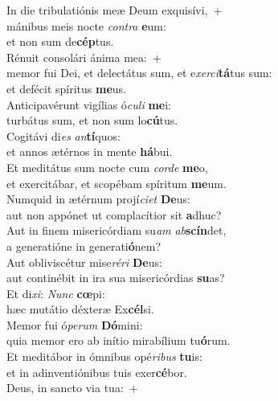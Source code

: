 \evenverse In die tribulatiónis meæ Deum exquisívi,~+\\\evenverse  mánibus meis nocte \textit{con}\textit{tra} \textbf{e}um:~\*\\
\evenverse et non sum de\textbf{cép}tus.\\
\oddverse Rénuit consolári ánima mea:~+\\
\oddverse  memor fui Dei, et delectátus sum, et e\textit{xer}\textit{ci}\textbf{tá}tus sum:~\*\\
\oddverse et defécit spíritus \textbf{me}us.\\
\evenverse Anticipavérunt vigílias ó\textit{cu}\textit{li} \textbf{me}i:~\*\\
\evenverse turbátus sum, et non sum lo\textbf{cú}tus.\\
\oddverse Cogitávi di\textit{es} \textit{an}\textbf{tí}quos:~\*\\
\oddverse et annos ætérnos in mente \textbf{há}bui.\\
\evenverse Et meditátus sum nocte cum \textit{cor}\textit{de} \textbf{me}o,~\*\\
\evenverse et exercitábar, et scopébam spíritum \textbf{me}um.\\
\oddverse Numquid in ætérnum projí\textit{ci}\textit{et} \textbf{De}us:~\*\\
\oddverse aut non appónet ut complacítior sit \textbf{a}dhuc?\\
\evenverse Aut in finem misericórdiam su\textit{am} \textit{ab}\textbf{scín}det,~\*\\
\evenverse a generatióne in generati\textbf{ó}nem?\\
\oddverse Aut obliviscétur mise\textit{ré}\textit{ri} \textbf{De}us:~\*\\
\oddverse aut continébit in ira sua misericórdias \textbf{su}as?\\
\evenverse Et di\textit{xi}: \textit{Nunc} \textbf{cœ}pi:~\*\\
\evenverse hæc mutátio déxteræ Ex\textbf{cél}si.\\
\oddverse Memor fui ó\textit{pe}\textit{rum} \textbf{Dó}mini:~\*\\
\oddverse quia memor ero ab inítio mirabílium tu\textbf{ó}rum.\\
\evenverse Et meditábor in ómnibus opé\textit{ri}\textit{bus} \textbf{tu}is:~\*\\
\evenverse et in adinventiónibus tuis exer\textbf{cé}bor.\\
\oddverse Deus, in sancto via tua:~+\\
